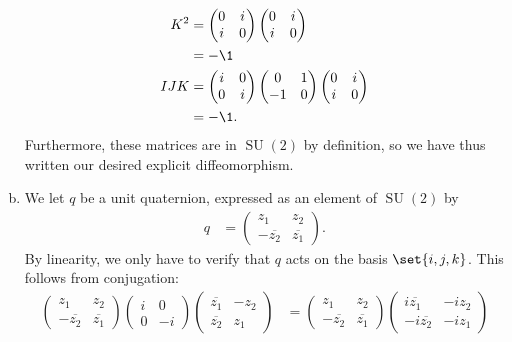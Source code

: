 \documentclass[10pt]{mypackage}
\begin{document}
\begin{solution}
\begin{enumerate}[(a)]
\begin{align*}
        K^2 &= \begin{pmatrix}0 & i \\ i & 0\end{pmatrix} \begin{pmatrix}0 & i \\ i & 0\end{pmatrix}\\
            &= -\1\\
        IJK &= \begin{pmatrix}i & 0 \\ 0 & i\end{pmatrix} \begin{pmatrix}0 & 1 \\ -1 & 0\end{pmatrix} \begin{pmatrix}0 & i \\ i & 0\end{pmatrix}\\
            &= -\1.
      \end{align*}
      Furthermore, these matrices are in $ \operatorname{SU}(2) $ by definition, so we have thus written our desired explicit diffeomorphism.
    \item We let $ q $ be a unit quaternion, expressed as an element of $ \operatorname{SU}(2) $ by
      \begin{align*}
        q &= \begin{pmatrix}z_1 & z_2 \\ - \overline{z_2} & \overline{z_1}\end{pmatrix}.
      \end{align*}
      By linearity, we only have to verify that $q$ acts on the basis $ \set{i,j,k} $. This follows from conjugation:
      \begin{align*}
        \begin{pmatrix}z_1 & z_2 \\ - \overline{z_2} & \overline{z_1}\end{pmatrix} \begin{pmatrix} i & 0 \\ 0 & -i \end{pmatrix} \begin{pmatrix} \overline{z_1} & - z_2 \\ \overline{z_2} & z_1\end{pmatrix} &= \begin{pmatrix}z_1 & z_2 \\ - \overline{z_2} & \overline{z_1}\end{pmatrix} \begin{pmatrix} i \overline{z_1} & -iz_2\\ -i \overline{z_2} & -iz_1\end{pmatrix}\\

\end{align*}
\end{enumerate}
\end{solution}
\end{document}
